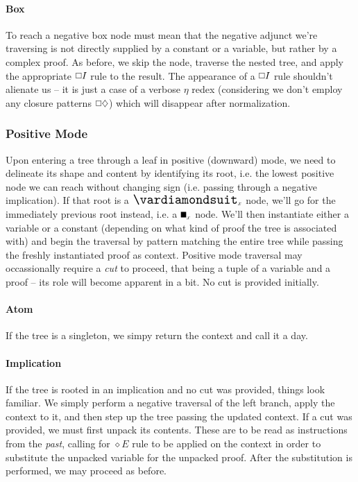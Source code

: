 \paragraph{Box}
To reach a negative box node must mean that the negative adjunct we're traversing is not directly supplied by a constant or a variable, but rather by a complex proof.
As before, we skip the node, traverse the nested tree, and apply the appropriate $\bx I$ rule to the result.
The appearance of a $\bx I$ rule shouldn't alienate us -- it is just a case of a verbose $\eta$ redex (considering we don't employ any closure patterns $\bx\diamond$) which will disappear after normalization.

\subsubsection{Positive Mode}
Upon entering a tree through a leaf in positive (downward) mode, we need to delineate its shape and content by identifying its root, i.e. the lowest positive node we can reach without changing sign (i.e. passing through a negative implication).
If that root is a $\dxdia{x}$ node, we'll go for the immediately previous root instead, i.e. a $\dxbox{x}$ node.
We'll then instantiate either a variable or a constant (depending on what kind of proof the tree is associated with) and begin the traversal by pattern matching the entire tree while passing the freshly instantiated proof as context.
Positive mode traversal may occassionally require a \textit{cut} to proceed, that being a tuple of a variable and a proof -- its role will become apparent in a bit.
No cut is provided initially.

\paragraph{Atom}
If the tree is a singleton, we simpy return the context and call it a day.

\paragraph{Implication}
If the tree is rooted in an implication and no cut was provided, things look familiar.
We simply perform a negative traversal of the left branch, apply the context to it, and then step up the tree passing the updated context.
If a cut was provided, we must first unpack its contents.
These are to be read as instructions from the \textit{past}, calling for $\diamond E$ rule to be applied on the context in order to substitute the unpacked variable for the unpacked proof. 
After the substitution is performed, we may proceed as before.

